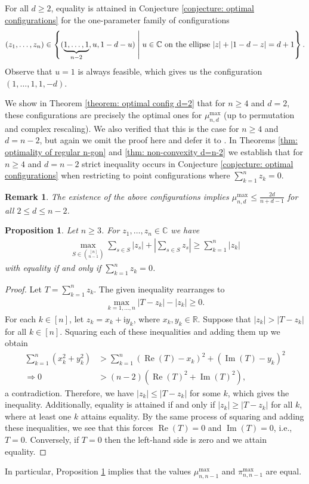 \documentclass[reqno,hidelinks,11pt]{amsart}
\numberwithin{equation}{section}
\newtheorem{remark}[theorem]{Remark}
\newtheorem{proposition}[theorem]{Proposition}
\def\RR{\mathbb{R}}
\def\CC{\mathbb{C}}
\def\Re{\operatorname{Re}}
\def\Im{\operatorname{Im}}
\newcommand{\suchthat}{\;\ifnum\currentgrouptype=16 \middle\fi|\;}
\begin{document}
For all $d\ge2$, equality is attained in Conjecture \ref{conjecture: optimal configurations} for the one-parameter family of configurations
\begin{align}\label{eq: configs}
    (z_1, \ldots, z_n) \in \left\{ (\underbrace{1,\dots,1}_{n-2},u,1-d-u) \suchthat u\in\CC \,\,\text{on the ellipse}\,\, |z|+|1-d-z|=d+1\right\}.
\end{align}
Observe that $u=1$ is always feasible, which gives us the configuration $(1,\dots,1, 1,-d)$. 

We show in Theorem \ref{theorem: optimal config d=2} that for $n \geq 4$ and $d=2$, these configurations are precisely the optimal ones for $\mu_{n,d}^{\max}$ (up to permutation and complex rescaling). We also verified that this is the case for $n \geq 4$ and $d = n - 2$, but again we omit the proof here and defer it to \cite{lee2026}.
In Theorems \ref{thm: optimality of regular n-gon} and \ref{thm: non-convexity d=n-2} we establish that for $n \geq 4$ and $d=n-2$ strict inequality occurs in Conjecture \ref{conjecture: optimal configurations} when restricting to point configurations where $\sum_{k=1}^n z_k = 0$.

\begin{remark} \label{rem: sharp?}
The existence of the above configurations implies $\mu_{n, d}^{\max} \leq \frac{2d}{n + d - 1}$ for all $2 \leq d \leq n - 2$. 
\end{remark}


\begin{proposition}\label{prop: d=n-1}
    Let $n \geq 3$. For $z_1,\dots,z_n\in\CC$ we have
    \begin{align*}
        \max_{S\in\binom{[n]}{n-1}}\sum_{s\in S}|z_s|+\left|\sum_{s\in S} z_s\right|\ge\sum_{k=1}^n|z_k|
    \end{align*}
    with equality if and only if $\sum_{k=1}^n z_k=0$.
\end{proposition}
\begin{proof}
    Let $T=\sum_{k=1}^n z_k$. The given inequality rearranges to
    \begin{align*}
        \max_{k=1,\dots,n}|T-z_k|-|z_k|\ge0.
    \end{align*}
    For each $k \in [n]$, let $z_k=x_k+\mathrm{i}y_k$, where $x_k,y_k\in\RR$. Suppose that $|z_k|>|T-z_k|$ for all $k \in [n]$. Squaring each of these inequalities and adding them up we obtain
    \begin{align*}
        \sum_{k=1}^n (x_k^2+y_k^2)&>\sum_{k=1}^n(\Re(T)-x_k)^2+(\Im(T)-y_k)^2\\
       \Rightarrow 0 &>(n-2)(\Re(T)^2+\Im(T)^2),      
    \end{align*}
    a contradiction. Therefore, we have $|z_k| \leq |T - z_k|$ for some $k$, which gives the inequality. Additionally, equality is attained if and only if $|z_k| \geq |T - z_k|$ for all $k$, where at least one $k$ attains equality. By the same process of squaring and adding these inequalities, we see that this forces $\Re(T)=0$ and $\Im(T)=0$, i.e., $T=0$. Conversely, if $T = 0$ then the left-hand side is zero and we attain equality.
\end{proof}
In particular, Proposition \ref{prop: d=n-1} implies that the values $\mu_{n,n-1}^{\max}$ and $\pi_{n,n-1}^{\max}$ are equal. 
\end{document}
